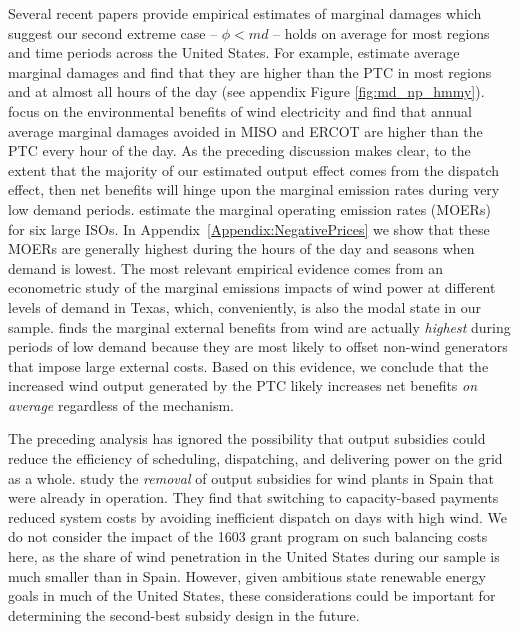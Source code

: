 \documentclass[12pt]{article}
\begin{document}
Several recent papers provide empirical estimates of marginal damages which suggest our second extreme case -- $\phi < md$  -- holds on average for most regions and time periods across the United States. For example, \citet{holland_are_2016} estimate average marginal damages and find that they are higher than the PTC in most regions and at almost all hours of the day (see appendix Figure \ref{fig:md_np_hmmy}). \citet{fell_emissions_2021} focus on the environmental benefits of wind electricity and find that annual average marginal damages avoided in MISO and ERCOT are higher than the PTC every hour of the day. As the preceding discussion makes clear, to the extent that the majority of our estimated output effect comes from the dispatch effect, then net benefits will hinge upon the marginal emission rates during very low demand periods. \citet{callaway_location_2018} estimate the marginal operating emission rates (MOERs) for six large ISOs. In Appendix~\ref{Appendix:NegativePrices} we show that these MOERs are generally highest during the hours of the day and seasons when demand is lowest. The most relevant empirical evidence comes from an econometric study of the marginal emissions impacts of wind power at different levels of demand in Texas, which, conveniently, is also the modal state in our sample. \citet{novan_valuing_2015} finds the marginal external benefits from wind are actually \emph{highest} during periods of low demand because they are most likely to offset non-wind generators that impose large external costs. Based on this evidence, we conclude that the increased wind output generated by the PTC likely increases net benefits \emph{on average} regardless of the mechanism. 

The preceding analysis has ignored the possibility that output subsidies could reduce the efficiency of scheduling, dispatching, and delivering power on the grid as a whole. \citet{petersen2021Spain} study the \emph{removal} of output subsidies for wind plants in Spain that were already in operation. They find that switching to capacity-based payments reduced system costs by avoiding inefficient dispatch on days with high wind. We do not consider the impact of the 1603 grant program on such balancing costs here, as the share of wind penetration in the United States during our sample is much smaller than in Spain. However, given ambitious state renewable energy goals in much of the United States, these considerations could be important for determining the second-best subsidy design in the future. 
\end{document}
